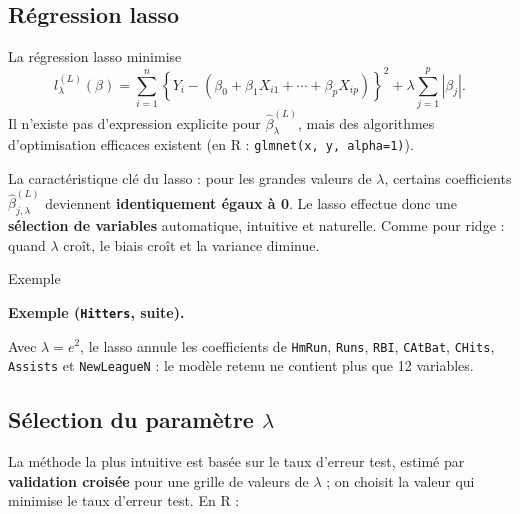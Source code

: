 \documentclass[
  french,
  letterpaper,
  DIV=11,
  numbers=noendperiod]{scrreprt}
\newenvironment{Shaded}{\begin{snugshade}}{\end{snugshade}}
\newcommand{\AttributeTok}[1]{\textcolor[rgb]{0.40,0.45,0.13}{#1}}
\newcommand{\DecValTok}[1]{\textcolor[rgb]{0.68,0.00,0.00}{#1}}
\newcommand{\FunctionTok}[1]{\textcolor[rgb]{0.28,0.35,0.67}{#1}}
\newcommand{\NormalTok}[1]{\textcolor[rgb]{0.00,0.23,0.31}{#1}}
\newcommand{\OtherTok}[1]{\textcolor[rgb]{0.00,0.23,0.31}{#1}}
\newcommand{\SpecialCharTok}[1]{\textcolor[rgb]{0.37,0.37,0.37}{#1}}
\begin{document}
\subsection{Régression lasso}\label{ruxe9gression-lasso}

La régression lasso minimise
\[l^{(L)}_\lambda(\beta) = \sum_{i=1}^n\left\{Y_i - (\beta_0 + \beta_1 X_{i1} + \cdots + \beta_p X_{ip})\right\}^2 + \lambda\sum_{j=1}^p|\beta_j|.\]
Il n'existe pas d'expression explicite pour \(\hat\beta^{(L)}_\lambda\),
mais des algorithmes d'optimisation efficaces existent (en R :
\texttt{glmnet(x,\ y,\ alpha=1)}).

La caractéristique clé du lasso : pour les grandes valeurs de
\(\lambda\), certains coefficients \(\hat\beta^{(L)}_{j,\lambda}\)
deviennent \textbf{identiquement égaux à 0}. Le lasso effectue donc une
\textbf{sélection de variables} automatique, intuitive et naturelle.
Comme pour ridge : quand \(\lambda\) croît, le biais croît et la
variance diminue.

{Exemple}

\textbf{Exemple (\texttt{Hitters}, suite).}

Avec \(\lambda = e^2\), le lasso annule les coefficients de
\texttt{HmRun}, \texttt{Runs}, \texttt{RBI}, \texttt{CAtBat},
\texttt{CHits}, \texttt{Assists} et \texttt{NewLeagueN} : le modèle
retenu ne contient plus que 12 variables.

\subsection{\texorpdfstring{Sélection du paramètre
\(\lambda\)}{Sélection du paramètre \textbackslash lambda}}\label{suxe9lection-du-paramuxe8tre-lambda}

La méthode la plus intuitive est basée sur le taux d'erreur test, estimé
par \textbf{validation croisée} pour une grille de valeurs de
\(\lambda\) ; on choisit la valeur qui minimise le taux d'erreur test.
En R :

\begin{Shaded}
\end{Shaded}
\end{document}
